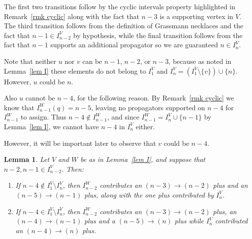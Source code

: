 \documentclass[11pt]{article}
\newtheorem{lem}[thm]{Lemma}
\theoremstyle{remark}
\theoremstyle{definition}
\begin{document}
The first two transitions follow by the cyclic intervals property highlighted in Remark~\ref{rmk cyclic} along with the fact that $n-3$ is a supporting vertex in $V$.  The third transition follows from the definition of Grassmann necklaces and the fact that $n-1\in I_{n-2}^V$ by hypothesis, while the final transition follows from the fact that $n-1$ supports an additional propagator so we are guaranteed $n \in I_n^V$.

Note that neither $u$ nor $v$ can be $n-1$, $n-2$, or $n-3$, because as noted in Lemma~\ref{lem I} these elements do not belong to $I_1^V$ and $I_n^V = (I_1^V\setminus \{v\}) \cup \{n\}$. However, $u$ could be $n$.  

Also $u$ cannot be $n-4$, for the following reason. By Remark~\ref{rmk cyclic} we know that $I_{n-1}^W(q) = n-5$, leaving no propagators supported on $n-4$ for $I_{n-1}^W$ to assign. Thus $n-4 \not\in I_{n-1}^W$, and since $I_{n-1}^W = I_n^V\cup\{n-1\}$ by Lemma~\ref{lem I}, we cannot have $n-4$ in $I_n^V$ either.

However, it will be important later to observe that $v$ could be $n-4$.

  \begin{lem}\label{lem n-2 bad part 1}
Let $V$ and $W$ be as in Lemma~\ref{lem I}, and suppose that $n-2,n-1 \in I_{n-2}^{V}$. Then:
  \begin{enumerate}
  \item If $n-4 \not\in I_1^V\setminus I_n^V$, then $I_{n-2}^W$ contributes an $(n-3)\rightarrow (n-2)$ plus and an $(n-5)\rightarrow (n-1)$ plus, along with the one plus contributed by $I_n^V$.
  \item If $n-4 \in I_1^V\setminus I_n^V$, then $I_{n-2}^W$ contributes an $(n-3)\rightarrow (n-2)$ plus, an $(n-4)\rightarrow (n-1)$ plus and a $(n-5)\rightarrow (n)$ plus while $I_n^V$ contributed an $(n-4)\rightarrow (n)$ plus.
  \end{enumerate}
  \end{lem}
\end{document}
